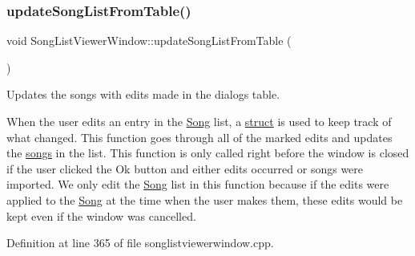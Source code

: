 \subsubsection{\texorpdfstring{update\+Song\+List\+From\+Table()}{updateSongListFromTable()}}
{\footnotesize\ttfamily void Song\+List\+Viewer\+Window\+::update\+Song\+List\+From\+Table (\begin{DoxyParamCaption}{ }\end{DoxyParamCaption})\hspace{0.3cm}{\ttfamily [private]}}



Updates the songs with edits made in the dialog\textquotesingle{}s table. 

When the user edits an entry in the \mbox{\hyperlink{class_song}{Song}} list, a \mbox{\hyperlink{struct_song_list_viewer_window_1_1song__edit}{struct}} is used to keep track of what changed. This function goes through all of the marked edits and updates the \mbox{\hyperlink{class_song}{songs}} in the list. This function is only called right before the window is closed if the user clicked the Ok button and either edits occurred or songs were imported. We only edit the \mbox{\hyperlink{class_song}{Song}} list in this function because if the edits were applied to the \mbox{\hyperlink{class_song}{Song}} at the time when the user makes them, these edits would be kept even if the window was cancelled. 

Definition at line 365 of file songlistviewerwindow.\+cpp.


